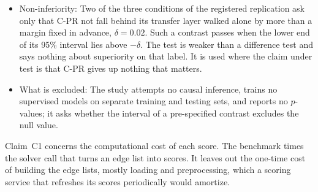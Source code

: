 \begin{itemize}
\item Non-inferiority: Two of the three conditions of the registered replication ask only that C-PR not fall behind its transfer layer walked alone by more than a margin fixed in advance, $\delta=0.02$. Such a contrast passes when the lower end of its 95\% interval lies above $-\delta$. The test is weaker than a difference test and says nothing about superiority on that label. It is used where the claim under test is that C-PR gives up nothing that matters.

\item What is excluded: The study attempts no causal inference, trains no supervised models on separate training and testing sets, and reports no $p$-values; it asks whether the interval of a pre-specified contrast excludes the null value.

\end{itemize}


Claim~C1 concerns the computational cost of each score. The benchmark times the solver call that turns an edge list into scores. It leaves out the one-time cost of building the edge lists, mostly loading and preprocessing, which a scoring service that refreshes its scores periodically would amortize.

